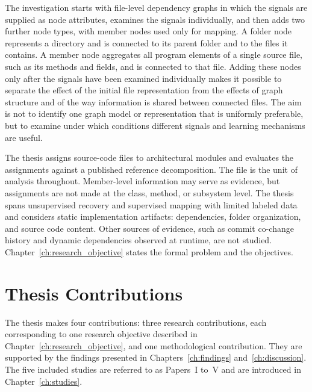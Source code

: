 The investigation starts with file-level dependency graphs in which the signals are supplied as node attributes, examines the signals individually, and then adds two further node types, with member nodes used only for mapping. A folder node represents a directory and is connected to its parent folder and to the files it contains. A member node aggregates all program elements of a single source file, such as its methods and fields, and is connected to that file. Adding these nodes only after the signals have been examined individually makes it possible to separate the effect of the initial file representation from the effects of graph structure and of the way information is shared between connected files. The aim is not to identify one graph model or representation that is uniformly preferable, but to examine under which conditions different signals and learning mechanisms are useful.

The thesis assigns source-code files to architectural modules and evaluates the assignments against a published reference decomposition. The file is the unit of analysis throughout. Member-level information may serve as evidence, but assignments are not made at the class, method, or subsystem level. The thesis spans unsupervised recovery and supervised mapping with limited labeled data and considers static implementation artifacts: dependencies, folder organization, and source code content. Other sources of evidence, such as commit co-change history and dynamic dependencies observed at runtime, are not studied. Chapter~\ref{ch:research_objective} states the formal problem and the objectives.

\section{Thesis Contributions}
\label{sec:intro-contributions}

The thesis makes four contributions: three research contributions, each corresponding to one research objective described in Chapter~\ref{ch:research_objective}, and one methodological contribution. They are supported by the findings presented in Chapters~\ref{ch:findings} and~\ref{ch:discussion}. The five included studies are referred to as Papers~I to~V and are introduced in Chapter~\ref{ch:studies}.

